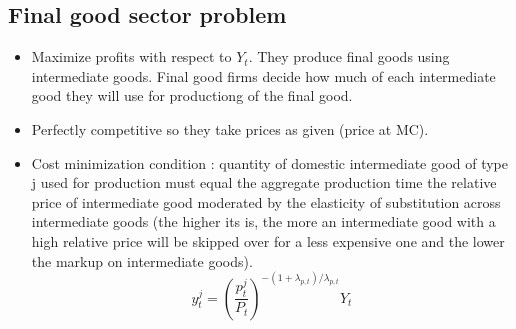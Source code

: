 \documentclass{article}
\begin{document}
\subsection{Final good sector problem}
\begin{itemize}
    \item Maximize profits with respect to $Y_t$. They produce final goods using intermediate goods.  Final good firms decide how much of each intermediate good they will use for productiong of the final good. 
    \item Perfectly competitive so they take prices as given (price at MC). 
    \item Cost minimization condition : quantity of domestic intermediate good of type j used for production must equal the aggregate production time the relative price of intermediate good moderated by the elasticity of substitution across intermediate goods (the higher its is, the more an intermediate good with a high relative price will be skipped over for a less expensive one and the lower the markup on intermediate goods). 
    \begin{equation}
        y_t^j=(\frac{p_t^j}{P_t})^{-(1+\lambda_{p,t})/\lambda_{p,t}}Y_t
    \end{equation}
\end{itemize}
\end{document}

